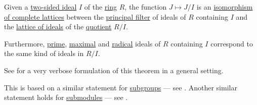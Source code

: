\begin{theorem}\label{thm:lattice_theorem_for_ideals}
  Given a \hyperref[def:semiring_ideal]{two-sided ideal} \( I \) of the \hyperref[def:ring]{ring} \( R \), the function \( J \mapsto J / I \) is an \hyperref[def:semilattice/homomorphism]{isomorphism of complete lattices} between the \hyperref[def:lattice_ideal/principal]{principal filter} of ideals of \( R \) containing \( I \) and the \hyperref[thm:semiring_of_ideals/lattice]{lattice of ideals} of the \hyperref[def:ring/quotient]{quotient} \( R / I \).

  Furthermore, \hyperref[def:semiring_ideal/prime]{prime}, \hyperref[def:semiring_ideal/maximal]{maximal} and \hyperref[def:radical_ideal]{radical} ideals of \( R \) containing \( I \) correspond to the same kind of ideals in \( R / I \).
\end{theorem}
\begin{comments}
  \item See  for a very verbose formulation of this theorem in a general setting.
  \item This is based on a similar statement for \hyperref[def:group/submodel]{subgroups} --- see . Another similar statement holds for \hyperref[def:module/submodel]{submodules} --- see .
\end{comments}
